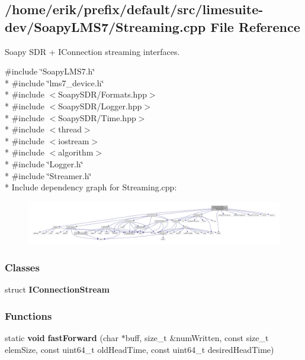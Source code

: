 \subsection{/home/erik/prefix/default/src/limesuite-\/dev/\+Soapy\+L\+M\+S7/\+Streaming.cpp File Reference}
\label{Streaming_8cpp}


Soapy S\+DR + I\+Connection streaming interfaces.  


{\ttfamily \#include \char`\"{}Soapy\+L\+M\+S7.\+h\char`\"{}}\\*
{\ttfamily \#include \char`\"{}lms7\+\_\+device.\+h\char`\"{}}\\*
{\ttfamily \#include $<$Soapy\+S\+D\+R/\+Formats.\+hpp$>$}\\*
{\ttfamily \#include $<$Soapy\+S\+D\+R/\+Logger.\+hpp$>$}\\*
{\ttfamily \#include $<$Soapy\+S\+D\+R/\+Time.\+hpp$>$}\\*
{\ttfamily \#include $<$thread$>$}\\*
{\ttfamily \#include $<$iostream$>$}\\*
{\ttfamily \#include $<$algorithm$>$}\\*
{\ttfamily \#include \char`\"{}Logger.\+h\char`\"{}}\\*
{\ttfamily \#include \char`\"{}Streamer.\+h\char`\"{}}\\*
Include dependency graph for Streaming.\+cpp\+:
\nopagebreak
\begin{figure}[H]
\begin{center}
\leavevmode
\includegraphics[width=350pt]{d7/d57/Streaming_8cpp__incl}
\end{center}
\end{figure}
\subsubsection*{Classes}
\begin{DoxyCompactItemize}
\item 
struct {\bf I\+Connection\+Stream}
\end{DoxyCompactItemize}
\subsubsection*{Functions}
\begin{DoxyCompactItemize}
\item 
static {\bf void} {\bf fast\+Forward} (char $\ast$buff, size\+\_\+t \&num\+Written, const size\+\_\+t elem\+Size, const uint64\+\_\+t old\+Head\+Time, const uint64\+\_\+t desired\+Head\+Time)
\end{DoxyCompactItemize}


